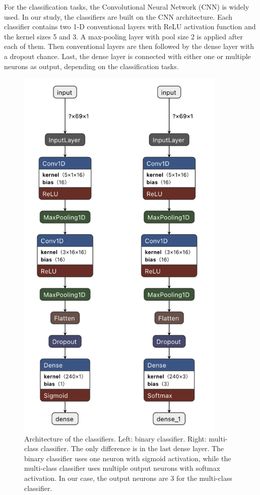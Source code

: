 For the classification tasks, the Convolutional Neural Network (CNN) is widely used. In our study, the classifiers are built on the CNN architecture.
Each classifier contains two 1-D conventional layers with ReLU activation function and the kernel sizes 5 and 3. 
A max-pooling layer with pool size 2 is applied after each of them. Then conventional layers are then followed by the dense layer with a dropout chance.
Last, the dense layer is connected with either one or multiple neurons as output, depending on the classification tasks.

\begin{figure}[ht]
    \centering
    \includegraphics[width= 10cm]{figures/models.png}
        \caption{Architecture of the classifiers. Left: binary classifier. Right: multi-class classifier. 
        The only difference is in the last dense layer. The binary classifier uses one neuron with sigmoid activation, 
        while the multi-class classifier uses multiple output neurons with softmax activation. In our case, the output neurons are 3 for the multi-class classifier.}
    \label{fig:models}
\end{figure}

